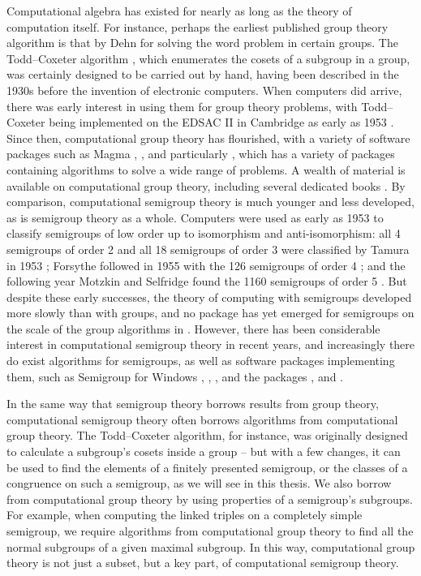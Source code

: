 Computational algebra has existed for nearly as long as the theory of
computation itself.  For instance, perhaps the earliest published group theory
algorithm is that by Dehn \cite{dehn_1911} for solving the word problem in
certain groups.  The Todd--Coxeter algorithm \cite{todd_coxeter_1936}, which
enumerates the cosets of a subgroup in a group, was certainly designed to be
carried out by hand, having been described in the 1930s before the invention of
electronic computers.  When computers did arrive, there was early interest in
using them for group theory problems, with Todd--Coxeter being implemented on
the EDSAC II in Cambridge as early as 1953 \cite{leech_1963}.  Since then,
computational group theory has flourished, with a variety of software packages
such as \textsf{Magma} \cite{magma}, \ACE{} \cite{ace}, and particularly \GAP{}
\cite{gap}, which has a variety of packages containing algorithms to solve a
wide range of problems.  A wealth of material is available on computational
group theory, including several dedicated books \cite{sims, cgt}.  By
comparison, computational semigroup theory is much younger and less developed,
as is semigroup theory as a whole.  Computers were used as early as 1953 to
classify semigroups of low order up to isomorphism and anti-isomorphism: all 4
semigroups of order 2 and all 18 semigroups of order 3 were classified by Tamura
in 1953 \cite{tamura_1953}; Forsythe followed in 1955 with the 126 semigroups of
order 4 \cite{order_4}; and the following year Motzkin and Selfridge found the
1160 semigroups of order 5 \cite{order_5, jurgensen_1977}.  But despite these
early successes, the theory of computing with semigroups developed more slowly
than with groups, and no package has yet emerged for semigroups on the scale of
the group algorithms in \GAP{}.  However, there has been considerable interest
in computational semigroup theory in recent years, and increasingly there do
exist algorithms for semigroups, as well as software packages implementing them,
such as \textsf{Semigroup for Windows} \cite{sgpwin}, \Semigroupe{}
\cite{semigroupe}, \libsemigroups{} \cite{libsemigroups}, and the \GAP{}
packages \Semigroups{} \cite{semigroups}, \smallsemi{} \cite{smallsemi} and
\kbmag{} \cite{kbmag}.

In the same way that semigroup theory borrows results from group theory,
computational semigroup theory often borrows algorithms from computational group
theory.  The Todd--Coxeter algorithm, for instance, was originally designed to
calculate a subgroup's cosets inside a group -- but with a few changes, it can
be used to find the elements of a finitely presented semigroup, or the classes
of a congruence on such a semigroup, as we will see in this thesis.  We also
borrow from computational group theory by using properties of a semigroup's
subgroups.  For example, when computing the linked triples on a completely
simple semigroup, we require algorithms from computational group theory to find
all the normal subgroups of a given maximal subgroup.  In this way,
computational group theory is not just a subset, but a key part, of
computational semigroup theory.

